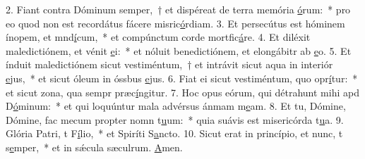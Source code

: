 2. Fiant contra Dóminum semper,~† et dispéreat de terra memória \uline{ó}rum:~* pro eo quod non est recordátus fácere misric\uline{ó}rdiam.
3. Et persecútus est hóminem ínopem, et mnd\uline{í}cum,~* et compúnctum corde mortfic\uline{á}re.
4. Et diléxit maledictiónem, et vénit \uline{e}i:~* et nóluit benedictiónem, et elongábitr ab \uline{e}o.
5. Et índuit maledictiónem sicut vestiméntum,~† et intrávit sicut aqua in interiór \uline{e}jus,~* et sicut óleum in óssbus \uline{e}jus.
6. Fiat ei sicut vestiméntum, quo opr\uline{í}tur:~* et sicut zona, qua sempr præc\uline{í}ngitur.
7. Hoc opus eórum, qui détrahunt mihi apd D\uline{ó}minum:~* et qui loquúntur mala advérsus ánmam m\uline{e}am.
8. Et tu, Dómine, Dómine, fac mecum propter nomn t\uline{u}um:~* quia suávis est misericórda t\uline{u}a.
9. Glória Patri, t F\uline{í}lio,~* et Spiríti S\uline{a}ncto.
10. Sicut erat in princípio, et nunc, t s\uline{e}mper,~* et in sǽcula sæculrum. \uline{A}men.
